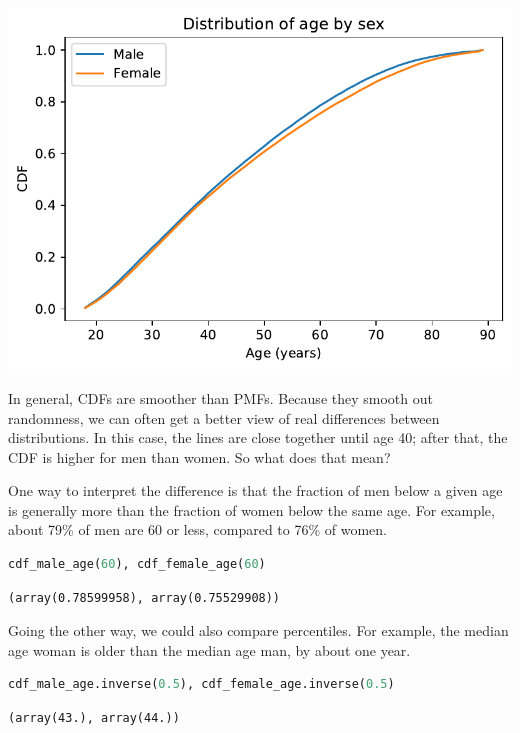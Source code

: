 \begin{center}
\includegraphics[scale=0.75]{chapters/08_distributions_files/08_distributions_92_0.pdf}
\end{center}

In general, CDFs are smoother than PMFs. Because they smooth out
randomness, we can often get a better view of real differences between
distributions. In this case, the lines are close together until age 40;
after that, the CDF is higher for men than women. So what does that
mean?

One way to interpret the difference is that the fraction of men below a
given age is generally more than the fraction of women below the same
age. For example, about 79\% of men are 60 or less, compared to 76\% of
women.

\begin{lstlisting}[language=Python]
cdf_male_age(60), cdf_female_age(60)
\end{lstlisting}

\begin{lstlisting}[]
(array(0.78599958), array(0.75529908))
\end{lstlisting}

Going the other way, we could also compare percentiles. For example, the
median age woman is older than the median age man, by about one year.

\begin{lstlisting}[language=Python]
cdf_male_age.inverse(0.5), cdf_female_age.inverse(0.5)
\end{lstlisting}

\begin{lstlisting}[]
(array(43.), array(44.))
\end{lstlisting}

